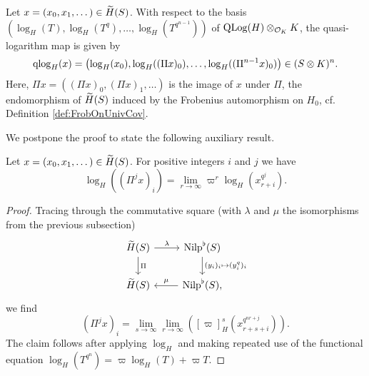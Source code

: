 \documentclass[../main.tex]{subfiles}
\begin{document}
\begin{prop}\label{prop:qlogmapExplicit}
  Let $x = (x_0, x_1, \dots) \in \Tilde H(S)$. With respect to the basis
  $(\log_H(T),\allowbreak \log_H(T^q), \allowbreak \dots, \allowbreak \log_H(T^{q^{n-1}}))$ of 
  $\QLog(H) \otimes_{\cO_K} K$, the quasi-logarithm map is given by
  \begin{equation*}
    \qlog_H(x) = \left(\log_H(x_0), \log_H((\Pi x)_0), \dots, \log_H((\Pi^{n-1}
    x)_0)\right) \in (S\otimes K)^n.
  \end{equation*}
  Here, $\Pi x = ((\Pi x)_0, (\Pi x)_1, \dots)$ is the image of $x$ under
  $\Pi$, the endomorphism of $\Tilde
  H(S)$ induced by the Frobenius automorphism on $H_0$, cf. Definition
  \ref{def:FrobOnUnivCov}.
\end{prop}
We postpone the proof to state the following auxiliary result.
\begin{lem}\label{lem:FrobOnTildeHExpl}
  Let $x = (x_0 ,x_1, \dots) \in \Tilde H(S)$. For positive integers $i$ and
  $j$ we have
  \begin{equation*}
    \log_H((\Pi^j x)_i) = \lim_{r \to \infty} \varpi^r \log_H(x_{r+i}^{q^j}).
  \end{equation*}
\begin{proof}
  Tracing through the commutative square (with $\lambda$ and $\mu$ the
  isomorphisms from the previous subsection)
    \begin{equation*}
    \begin{tikzcd}[ampersand replacement=\&]
    	{\Tilde H(S)} \& {\Nilp^\flat(S)} \\
    	{\Tilde H(S)} \& {\Nilp^\flat(S),}
    	\arrow["\lambda", from=1-1, to=1-2]
    	\arrow["\Pi", from=1-1, to=2-1]
    	\arrow["{(y_i)_i \mapsto (y_i^{q})_i}", from=1-2, to=2-2]
    	\arrow["\mu"', from=2-2, to=2-1]
    \end{tikzcd}
    \end{equation*}
    we find 
    \begin{equation} \label{eq:CompsOfPiExplicit}
      (\Pi^j x)_i = \lim_{s \to \infty} \lim_{r\to\infty} \left([\varpi]_H^s
      (x_{r+s+i}^{q^{nr + j}})\right).
    \end{equation}
    The claim follows after applying $\log_H$ and making repeated use of the
    functional equation $\log_H(T^{q^n}) = \varpi \log_H(T) + \varpi T$.
\end{proof}
\end{lem}
\end{document}
